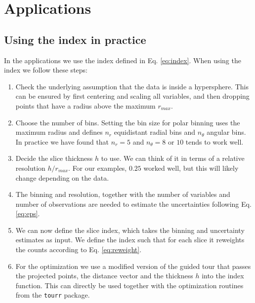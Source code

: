 \documentclass[]{interact}
\theoremstyle{plain}%
\theoremstyle{definition}
\theoremstyle{remark}
\def\tightlist{}
\begin{document}
\hypertarget{applications}{%
\section{\texorpdfstring{Applications
\label{sec:applications}}{Applications }}\label{applications}}

\hypertarget{using-the-index-in-practice}{%
\subsection{Using the index in
practice}\label{using-the-index-in-practice}}

In the applications we use the index defined in Eq. \ref{eq:index}. When
using the index we follow these steps:

\begin{enumerate}
\def\labelenumi{\arabic{enumi}.}
\tightlist
\item
  Check the underlying assumption that the data is inside a hypersphere.
  This can be ensured by first centering and scaling all variables, and
  then dropping points that have a radius above the maximum \(r_{max}\).
\item
  Choose the number of bins. Setting the bin size for polar binning uses
  the maximum radius and defines \(n_r\) equidistant radial bins and
  \(n_{\theta}\) angular bins. In practice we have found that \(n_r=5\)
  and \(n_{\theta}=8\) or \(10\) tends to work well.
\item
  Decide the slice thickness \(h\) to use. We can think of it in terms
  of a relative resolution \(h/r_{max}\). For our examples, \(0.25\)
  worked well, but this will likely change depending on the data.
\item
  The binning and resolution, together with the number of variables and
  number of observations are needed to estimate the uncertainties
  following Eq.\ref{eq:eps}.
\item
  We can now define the slice index, which takes the binning and
  uncertainty estimates as input. We define the index such that for each
  slice it reweights the counts according to Eq. \ref{eq:reweight}.
\item
  For the optimization we use a modified version of the guided tour that
  passes the projected points, the distance vector and the thickness
  \(h\) into the index function. This can directly be used together with
  the optimization routines from the \texttt{tourr} package.
\end{enumerate}
\end{document}
